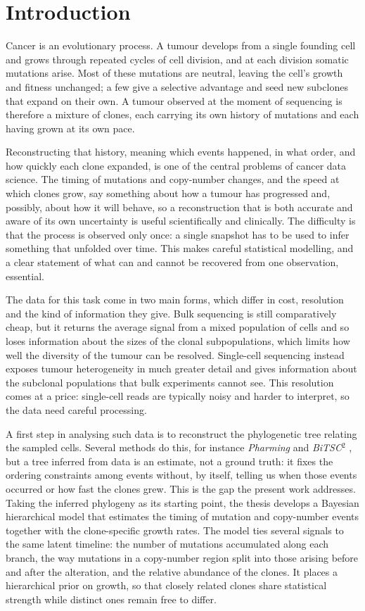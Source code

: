 \chapter*{Introduction}
\label{ch:introduction}
Cancer is an evolutionary process. A tumour develops from a single founding cell and
grows through repeated cycles of cell division, and at each division somatic
mutations arise. Most of these mutations are neutral, leaving the cell's growth and
fitness unchanged; a few give a selective advantage and seed new subclones that
expand on their own. A tumour observed at the moment of sequencing is therefore a
mixture of clones, each carrying its own history of mutations and each having grown
at its own pace.

Reconstructing that history, meaning which events happened, in what order, and how
quickly each clone expanded, is one of the central problems of cancer data science.
The timing of mutations and copy-number changes, and the speed at which clones grow,
say something about how a tumour has progressed and, possibly, about how it will
behave, so a reconstruction that is both accurate and aware of its own uncertainty
is useful scientifically and clinically. The difficulty is that the process is
observed only once: a single snapshot has to be used to infer something that
unfolded over time. This makes careful statistical modelling, and a clear statement
of what can and cannot be recovered from one observation, essential.

The data for this task come in two main forms, which differ in cost, resolution and
the kind of information they give. Bulk sequencing is still comparatively cheap, but
it returns the average signal from a mixed population of cells and so loses
information about the sizes of the clonal subpopulations, which limits how well the
diversity of the tumour can be resolved. Single-cell sequencing instead exposes
tumour heterogeneity in much greater detail and gives information about the subclonal
populations that bulk experiments cannot see. This resolution comes at a price:
single-cell reads are typically noisy and harder to interpret, so the data need
careful processing.

A first step in analysing such data is to reconstruct the phylogenetic tree relating
the sampled cells. Several methods do this, for instance \textit{Pharming}
\parencite{weber2026pharming} and \textit{BiTSC}$^2$ \parencite{chen2022bitsc2},
but a tree inferred from data is an estimate, not a ground truth:
it fixes the ordering constraints among events without, by itself, telling us when
those events occurred or how fast the clones grew. This is the gap the present work
addresses. Taking the inferred phylogeny as its starting point, the thesis develops
a Bayesian hierarchical model that estimates the timing of mutation and
copy-number events together with the clone-specific growth rates. The model ties
several signals to the same latent timeline: the number of mutations accumulated
along each branch, the way mutations in a copy-number region split into those arising
before and after the alteration, and the relative abundance of the clones. It places
a hierarchical prior on growth, so that closely related clones share statistical
strength while distinct ones remain free to differ.

